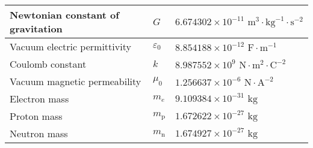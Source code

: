 \documentclass[../main.tex]{subfiles}
\begin{document}
\begin{center}
\begin{tabular}{|l|l|l|}
        \hline\rowcolor{gray!10}
        Newtonian constant of gravitation        & $G$                                   & $6.674302\times 10^{-11}\text{ m}^3\cdot\text{kg}^{-1}\cdot\text{s}^{-2}$ \\
        \hline\rowcolor{gray!10}
        Vacuum electric permittivity             & $\varepsilon_0$                       & $8.854188\times 10^{-12}\text{ F}\cdot\text{m}^{-1}$                      \\
        \hline\rowcolor{gray!10}
        Coulomb constant                         & $k$                                   & $8.987552\times 10^9\text{ N}\cdot\text{m}^2\cdot\text{C}^{-2}$           \\
        \hline\rowcolor{gray!10}
        Vacuum magnetic permeability             & $\mu_0$                               & $1.256637\times 10^{-6}\text{ N}\cdot\text{A}^{-2}$                       \\
        \hline\rowcolor{gray!10}
        Electron mass                            & $m_e$                                 & $9.109384\times 10^{-31}\text{ kg}$                                       \\
        \hline\rowcolor{gray!10}
        Proton mass                              & $m_\text{p}$                          & $1.672622\times 10^{-27}\text{ kg}$                                       \\
        \hline\rowcolor{gray!10}
        Neutron mass                             & $m_\text{n}$                          & $1.674927\times 10^{-27}\text{ kg}$                                       \\
        \hline
    \end{tabular}
\end{center}
\end{document}

